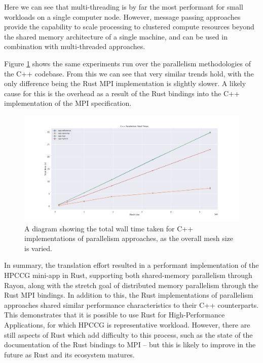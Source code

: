 Here we can see that multi-threading is by far the most performant for small workloads on a single computer node. However, message passing approaches provide the capability to scale processing to clustered compute resources beyond the shared memory architecture of a single machine, and can be used in combination with multi-threaded approaches.

Figure \ref{fig:translation_parallelism_cpp} shows the same experiments run over the parallelism methodologies of the C++ codebase. From this we can see that very similar trends hold, with the only difference being the Rust MPI implementation is slightly slower. A likely cause for this is the overhead as a result of the Rust bindings into the C++ implementation of the MPI specification.

\begin{figure}[H]
    \centering
    \includegraphics[width=\textwidth]{images/3_translation/performance/translation_parallelism_cpp.png}
    \caption{A diagram showing the total wall time taken for C++ implementations of parallelism approaches, as the overall mesh size is varied.}
    \label{fig:translation_parallelism_cpp}
\end{figure}

In summary, the translation effort resulted in a performant implementation of the HPCCG mini-app in Rust, supporting both shared-memory parallelism through Rayon, along with the stretch goal of distributed memory parallelism through the Rust MPI bindings. In addition to this, the Rust implementations of parallelism approaches shared similar performance characteristics to their C++ counterparts. This demonstrates that it is possible to use Rust for High-Performance Applications, for which HPCCG is representative workload. However, there are still aspects of Rust which add difficulty to this process, such as the state of the documentation of the Rust bindings to MPI -- but this is likely to improve in the future as Rust and its ecosystem matures.



